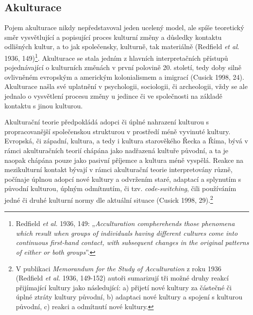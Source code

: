 
\subsection[akulturace]{Akulturace}

Pojem akulturace nikdy nepředstavoval jeden ucelený model, ale spíše teoretický směr vysvětlující a popisující proces kulturní změny a důsledky kontaktu odlišných kultur, a to jak společensky, kulturně, tak materiálně (Redfield {\em et al}. 1936, 149)\footnote{Redfield {\em et al.} 1936, 149: „{\em Acculturation compherehends those phenomena which result when groups of individuals having different cultures come into continuous first-hand contact, with subsequent changes in the original patterns of either or both groups}”.}. Akulturace se stala jedním z hlavních interpretačních přístupů pojednávající o kulturních změnách v první polovině 20. století, tedy doby silně ovlivněném evropským a americkým kolonialismem a imigrací (Cusick 1998, 24). Akulturace našla své uplatnění v psychologii, sociologii, či archeologii, vždy se ale jednalo o vysvětlení procesu změny u jedince či ve společnosti na základě kontaktu s jinou kulturou.

Akulturační teorie předpokládá adopci či úplné nahrazení kulturou s propracovanější společenskou strukturou v prostředí méně vyvinuté kultury. Evropská, či západní, kultura, a tedy i kultura starověkého Řecka a Říma, bývá v rámci akulturačních teorií chápána jako nadřazená kultuře původní, a ta je naopak chápána pouze jako pasivní příjemce a kultura méně vyspělá. Reakce na mezikulturní kontakt bývají v rámci akulturační teorie interpretovány různě, počínaje úplnou adopcí nové kultury a odvržením staré, adaptací a splynutím s původní kulturou, úplným odmítnutím, či tzv. {\em code-switching}, čili používáním jedné či druhé kulturní normy dle aktuální situace (Cusick 1998, 29).\footnote{V publikaci {\em Memorandum for the Study of Acculturation} z roku 1936 (Redfield {\em et al.} 1936, 149-152) autoři sumarizují tři možné druhy reakcí přijímající kultury jako následující: a) přijetí nové kultury za částečné či úplné ztráty kultury původní, b) adaptaci nové kultury a spojení s kulturou původní, c) reakci a odmítnutí nové kultury.}

